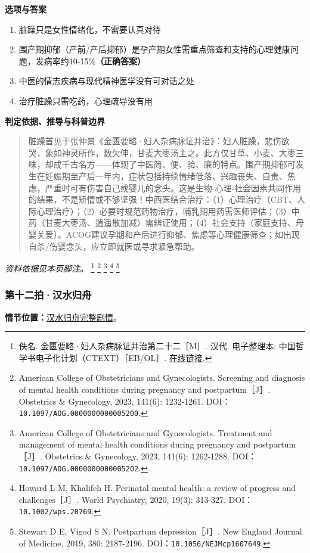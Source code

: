 \textbf{选项与答案}
\begin{enumerate}[label=\Alph*.,leftmargin=*]
  \item 脏躁只是女性情绪化，不需要认真对待
  \item 围产期抑郁（产前/产后抑郁）是孕产期女性需重点筛查和支持的心理健康问题，发病率约10-15\%\textbf{（正确答案）}
  \item 中医的情志疾病与现代精神医学没有可对话之处
  \item 治疗脏躁只需吃药，心理疏导没有用
\end{enumerate}
\textbf{判定依据、推导与科普边界}
\begin{quote}脏躁首见于张仲景《金匮要略·妇人杂病脉证并治》：妇人脏躁，悲伤欲哭，象如神灵所作，数欠伸，甘麦大枣汤主之。此方仅甘草、小麦、大枣三味，却成千古名方——体现了中医简、便、验、廉的特点。围产期抑郁可发生在妊娠期至产后一年内，症状包括持续情绪低落、兴趣丧失、自责、焦虑，严重时可有伤害自己或婴儿的念头。这是生物-心理-社会因素共同作用的结果，不是矫情或不够坚强！中西医结合治疗：（1）心理治疗（CBT、人际心理治疗）；（2）必要时规范药物治疗，哺乳期用药需医师评估；（3）中药（甘麦大枣汤、逍遥散加减）需辨证使用；（4）社会支持（家庭支持、母婴关爱）。ACOG建议孕期和产后进行抑郁、焦虑等心理健康筛查；如出现自杀/伤婴念头，应立即就医或寻求紧急帮助。\end{quote}
\noindent\textit{资料依据见本页脚注。}
\footnote{佚名. 金匮要略·妇人杂病脉证并治第二十二［M］. 汉代. 电子整理本: 中国哲学书电子化计划（CTEXT）［EB/OL］. \href{https://ctext.org/jinkui-yaolue/22/zh}{在线链接}.}
\footnote{American College of Obstetricians and Gynecologists. Screening and diagnosis of mental health conditions during pregnancy and postpartum［J］. Obstetrics \& Gynecology, 2023, 141(6): 1232-1261. DOI：\nolinkurl{10.1097/AOG.0000000000005200}.}
\footnote{American College of Obstetricians and Gynecologists. Treatment and management of mental health conditions during pregnancy and postpartum［J］. Obstetrics \& Gynecology, 2023, 141(6): 1262-1288. DOI：\nolinkurl{10.1097/AOG.0000000000005202}.}
\footnote{Howard L M, Khalifeh H. Perinatal mental health: a review of progress and challenges［J］. World Psychiatry, 2020, 19(3): 313-327. DOI：\nolinkurl{10.1002/wps.20769}.}
\footnote{Stewart D E, Vigod S N. Postpartum depression［J］. New England Journal of Medicine, 2019, 380: 2187-2196. DOI：\nolinkurl{10.1056/NEJMcp1607649}.}

\subsubsection{第十二拍·汉水归舟}\label{question:zhouzhiruo:12}
\textbf{情节位置：}\hyperref[plot:zhouzhiruo:12]{汉水归舟完整剧情}。

